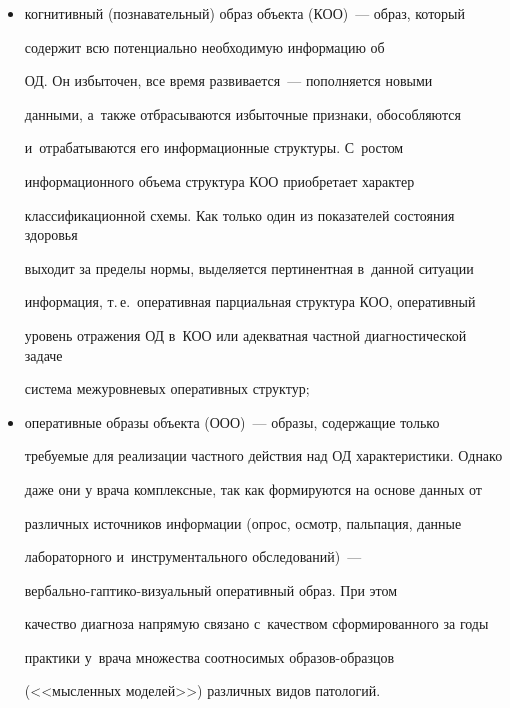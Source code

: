   \begin{itemize}

\item когнитивный (познавательный) образ объекта (КОО)~--- образ, который 

содержит всю потенциально необходимую информацию об 

ОД. Он избыточен, все время развивается~--- пополняется новыми 

данными, а~также отбрасываются избыточные признаки, обособляются 

и~отрабатываются его информационные структуры. С~ростом 

информационного объема структура КОО приобретает характер 

классификационной схемы. Как только один из показателей состояния здоровья 

выходит за пределы нормы, выделяется пертинентная в~данной ситуации 

информация, т.\,е.\ оперативная парциальная структура КОО, оперативный 

уровень отражения ОД в~КОО или адекватная частной диагностической задаче 

система межуровневых оперативных структур;

\item оперативные образы объекта (ООО)~--- образы, содержащие только 

требуемые для реализации частного действия над ОД характеристики. Однако 

даже они у врача комплексные, так как формируются на основе данных от 

различных источников информации (опрос, осмотр, пальпация, данные 

лабораторного и~инструментального обследований)~---  

вер\-баль\-но-гап\-ти\-ко-ви\-зу\-аль\-ный оперативный образ. При этом 

качество диагноза напрямую связано с~качеством сформированного за годы 

практики у~врача множества соотносимых об\-ра\-зов-об\-раз\-цов 

(<<мысленных моделей>>) различных видов патологий.

 \begin{table}\small

  \begin{center}

  \begin{tabular}{|c|p{98mm}|}


\end{tabular}
\end{center}
\end{table}
\end{itemize}
